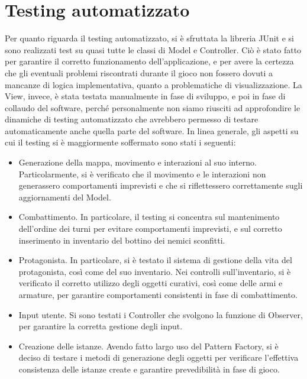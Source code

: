 \documentclass[a4paper,12pt]{report}
\begin{document}
\section{Testing automatizzato}

Per quanto riguarda il testing automatizzato, si è sfruttata la libreria JUnit e si sono realizzati test su quasi tutte le classi di Model e Controller. Ciò è stato fatto per garantire il corretto funzionamento dell’applicazione, e per avere la certezza che gli eventuali problemi riscontrati durante il gioco non fossero dovuti a mancanze di logica implementativa, quanto a problematiche di visualizzazione. 
%
\newline La View, invece, è stata testata manualmente in fase di sviluppo, e poi in fase di collaudo del software, perché personalmente non siamo riusciti ad approfondire le dinamiche di testing automatizzato che avrebbero permesso di testare automaticamente anche quella parte del software.
%
\newline In linea generale, gli aspetti su cui il testing si è maggiormente soffermato sono stati i seguenti:

\begin{itemize}
	\item Generazione della mappa, movimento e interazioni al suo interno. Particolarmente, si è verificato che il movimento e le interazioni non generassero comportamenti imprevisti e che si riflettessero correttamente sugli aggiornamenti del Model.
	\item Combattimento. In particolare, il testing si concentra sul mantenimento dell’ordine dei turni per evitare comportamenti imprevisti, e sul corretto inserimento in inventario del bottino dei nemici sconfitti.
	\item Protagonista. In particolare, si è testato il sistema di gestione della vita del protagonista, così come del suo inventario. Nei controlli sull’inventario, si è verificato il corretto utilizzo degli oggetti curativi, così come delle armi e armature, per garantire comportamenti consistenti in fase di combattimento.
	\item Input utente. Si sono testati i Controller che svolgono la funzione di Observer, per garantire la corretta gestione degli input.
	\item Creazione delle istanze. Avendo fatto largo uso del Pattern Factory, si è deciso di testare i metodi di generazione degli oggetti per verificare l’effettiva consistenza delle istanze create e garantire prevedibilità in fase di gioco.
\end{itemize}
\end{document}
